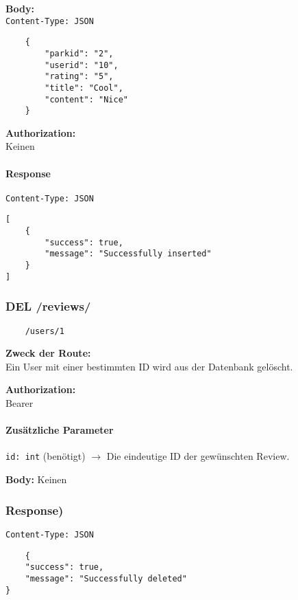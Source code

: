 \textbf{Body:} \\
\lstinline{Content-Type: JSON}
\begin{lstlisting}
    {
        "parkid": "2",
        "userid": "10",
        "rating": "5",
        "title": "Cool",
        "content": "Nice"
    }
\end{lstlisting}

\textbf{Authorization:} \\
Keinen

\paragraph{Response }

\lstinline{Content-Type: JSON}
\begin{lstlisting}
[
    {
        "success": true,
        "message": "Successfully inserted"
    }
]
\end{lstlisting}

\pagebreak

\pagebreak

\subsubsection{DEL /reviews/}

\begin{lstlisting}
    /users/1
\end{lstlisting}

\textbf{Zweck der Route:} \\
Ein User mit einer bestimmten ID wird aus der Datenbank gelöscht.

\textbf{Authorization:} \\
Bearer

\paragraph{Zusätzliche Parameter}
\lstinline{id: int} (benötigt)
$\rightarrow$ Die eindeutige ID der gewünschten Review.

\textbf{Body:}
Keinen


\subsubsection{Response)}

\lstinline{Content-Type: JSON}
\begin{lstlisting}
    {
    "success": true,
    "message": "Successfully deleted"
}
\end{lstlisting}

